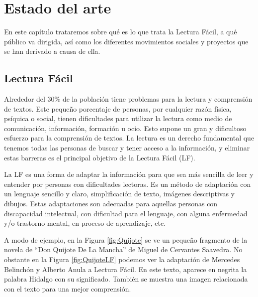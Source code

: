 \chapter{Estado del arte}
\label{cap:estadoDeLaCuestion}


En este capítulo trataremos sobre qué es lo que trata la Lectura Fácil, a qué público va dirigida, así como los diferentes movimientos sociales y proyectos que se han derivado a causa de ella.


\section{Lectura Fácil}
Alrededor del 30\% de la población tiene problemas para la lectura y comprensión de textos. Este pequeño porcentaje de personas, por cualquier razón física, psíquica o social, tienen dificultades para utilizar la lectura como medio de comunicación, información, formación u ocio. Esto supone un gran y dificultoso esfuerzo para la comprensión de textos. La lectura es un derecho fundamental que tenemos todas las personas de buscar y tener acceso a la información, y eliminar estas barreras es el principal objetivo de la Lectura Fácil (LF).

La LF es una forma de adaptar la información para que sea más sencilla de leer y entender por personas con dificultades lectoras. Es un método de adaptación con un lenguaje sencillo y claro, simplificación de texto, imágenes descriptivas y dibujos. Estas adaptaciones son adecuadas para aquellas personas con discapacidad intelectual, con dificultad para el lenguaje, con alguna enfermedad y/o trastorno mental, en proceso de aprendizaje, etc.

 \setlength{\parskip}{10pt}


A modo de ejemplo, en la Figura \ref{fig:Quijote} se ve un pequeño fragmento de la novela de ``Don Quijote De La Mancha'' de Miguel de Cervantes Saavedra. No obstante en la Figura \ref{fig:QuijoteLF} podemos ver la adaptación de Mercedes Belinchón y Alberto Anula a Lectura Fácil. En este texto, aparece en negrita la palabra Hidalgo con su significado. También se muestra una imagen relacionada con el texto para una mejor comprensión.

